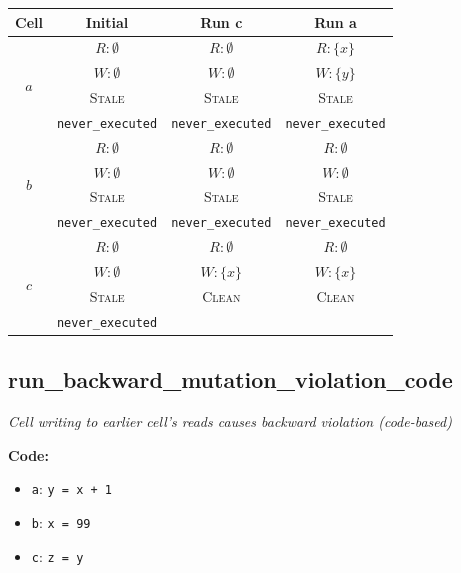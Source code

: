 \documentclass{article}
\begin{document}
\begin{center}
\small
\begin{tabular}{|c|c|c|c|}
\hline
\textbf{Cell} & \textbf{Initial} & \textbf{Run c} & \textbf{Run a} \\
\hline
\multirow{4}{*}{$a$}
  & $R: \emptyset$ & $R: \emptyset$ & $R: \{x\}$ \\
  & $W: \emptyset$ & $W: \emptyset$ & $W: \{y\}$ \\
  & \textsc{Stale} & \textsc{Stale} & \textsc{Stale} \\
  & \footnotesize\texttt{never\_executed} & \footnotesize\texttt{never\_executed} & \footnotesize\texttt{never\_executed} \\
\hline
\multirow{4}{*}{$b$}
  & $R: \emptyset$ & $R: \emptyset$ & $R: \emptyset$ \\
  & $W: \emptyset$ & $W: \emptyset$ & $W: \emptyset$ \\
  & \textsc{Stale} & \textsc{Stale} & \textsc{Stale} \\
  & \footnotesize\texttt{never\_executed} & \footnotesize\texttt{never\_executed} & \footnotesize\texttt{never\_executed} \\
\hline
\multirow{4}{*}{$c$}
  & $R: \emptyset$ & $R: \emptyset$ & $R: \emptyset$ \\
  & $W: \emptyset$ & $W: \{x\}$ & $W: \{x\}$ \\
  & \textsc{Stale} & \textsc{Clean} & \textsc{Clean} \\
  & \footnotesize\texttt{never\_executed} &  &  \\
\hline
\end{tabular}
\end{center}


\subsection{run\_backward\_mutation\_violation\_code}
\textit{Cell writing to earlier cell's reads causes backward violation (code-based)}

\textbf{Code:}
\begin{itemize}
  \item \texttt{a}: \verb|y = x + 1|
  \item \texttt{b}: \verb|x = 99|
  \item \texttt{c}: \verb|z = y|
\end{itemize}
\end{document}
